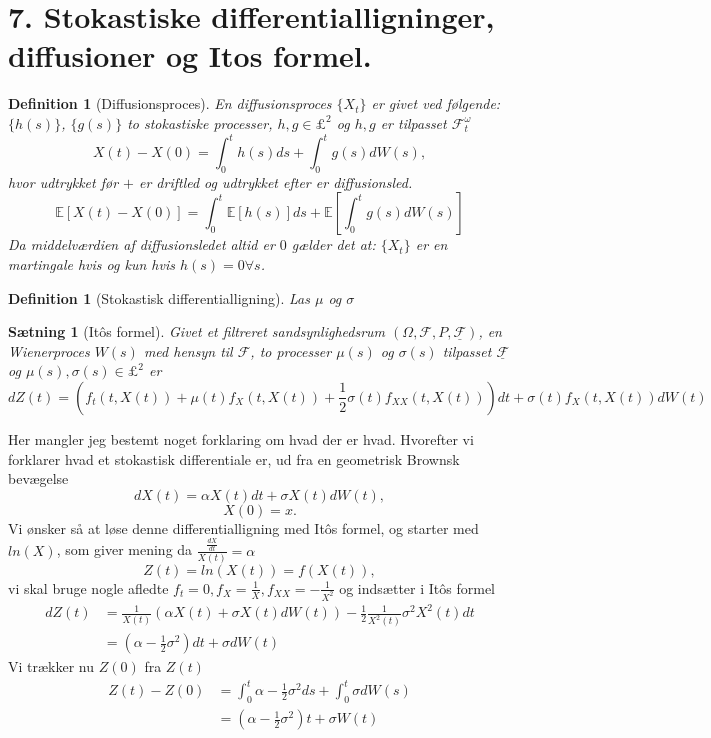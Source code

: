 \documentclass[12pt]{report}
\newtheorem{theorem}[lemma]{Sætning}
\newtheorem{definition}[lemma]{Definition}
\theoremstyle{break}
\theoremstyle{break}
\newcommand{\EE}{\mathbb{E}}
\newcommand{\FI}{\mathcal{F}}
\newcommand{\FIU}{\underline{\mathcal{F}}}
\newcommand{\1}{\mathds{1}}
\begin{document}
\section*{7. Stokastiske differentialligninger, diffusioner og Itos formel.}
\begin{definition}[Diffusionsproces]
	En diffusionsproces $\{X_t\}$ er givet ved følgende: $\{h(s) \}$, $\{ g(s) \}$ to stokastiske processer, $h,g\in \pounds^2$ og $h,g$ er tilpasset $\FI_t^\omega$ \[ X(t)-X(0)=\int_0^t h(s)ds+\int_0^t g(s) dW(s), \] hvor udtrykket før $+$ er driftled og udtrykket efter er diffusionsled.
	\[ \EE\left[  X(t)-X(0) \right] = \int_0^t \EE\left[h(s)\right] ds+\EE\left[\int_0^t g(s) dW(s)\right]\]
	Da middelværdien af diffusionsledet altid er $0$ gælder det at: $\{X_t\}$ er en martingale hvis og kun hvis $h(s)=0\forall s$.
\end{definition}
\begin{definition}[Stokastisk differentialligning]
	Las $\mu$ og $\sigma$
\end{definition}
\begin{theorem}[Itôs formel]
	Givet et  filtreret sandsynlighedsrum $(\Omega, \FI, P, \FIU)$, en Wienerproces $W(s)$ med hensyn til $\FI$, to processer $\mu(s)$ og $\sigma(s)$ tilpasset $\FIU$ og $\mu(s),\sigma(s) \in \pounds^2$ er \[ dZ(t)=\left( f_t(t,X(t))+\mu(t)f_X(t,X(t))+\frac{1}{2}\sigma(t)f_{XX}(t,X(t)) \right)dt+\sigma(t)f_X(t,X(t))dW(t) \]
	
\end{theorem}
Her mangler jeg bestemt noget forklaring om hvad der er hvad. Hvorefter vi forklarer hvad et stokastisk differentiale er, ud fra en geometrisk Brownsk bevægelse \[ dX(t)=\alpha X(t) dt +\sigma X(t) dW(t),\]
\[X(0)=x. \]
Vi ønsker så at løse denne differentialligning med Itôs formel, og starter med $ln(X)$, som giver mening da $\frac{\frac{dX}{dt}}{X(t)}=\alpha$
\[ Z(t)=ln(X(t))=f(X(t)), \] vi skal bruge nogle afledte $f_t=0, f_X=\frac{1}{X}, f_{XX}=-\frac{1}{X^2}$ og indsætter i Itôs formel
\begin{align*}
	dZ(t)&=\frac{1}{X(t)}\left( \alpha X(t) +\sigma X(t) dW(t) \right)-\frac{1}{2}\frac{1}{X^2(t)}\sigma^2X^2(t)dt\\
	&=\left(\alpha-\frac{1}{2}\sigma^2\right)dt+\sigma dW(t)
\end{align*}
Vi trækker nu $Z(0)$ fra $Z(t)$
\begin{align*}
	Z(t)-Z(0)&=\int_{0}^{t}\alpha-\frac{1}{2}\sigma^2ds+\int_{0}^{t}\sigma dW(s)\\
	&=\left( \alpha-\frac{1}{2}\sigma^2 \right)t+\sigma W(t)
\end{align*}
\end{document}
